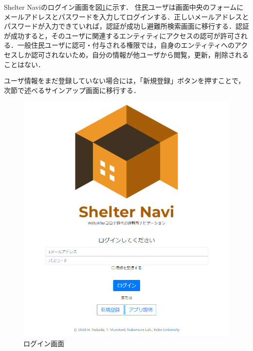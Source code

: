 \documentclass[technicalreport,dvipdfmx]{ieicej}
\begin{document}
Shelter Naviのログイン画面を図\ref{fig:login}に示す．
住民ユーザは画面中央のフォームにメールアドレスとパスワードを入力してログインする．正しいメールアドレスとパスワードが入力できていれば，認証が成功し避難所検索画面に移行する．認証が成功すると，そのユーザに関連するエンティティにアクセスの認可が許可される．一般住民ユーザに認可・付与される権限では，自身のエンティティへのアクセスしか認可されないため，自分の情報が他ユーザから閲覧，更新，削除されることはない．

ユーザ情報をまだ登録していない場合には，「新規登録」ボタンを押すことで，次節で述べるサインアップ画面に移行する．

\begin{figure}[t]
     \begin{center}
          \includegraphics[scale=0.5,pagebox=cropbox,clip]{img/login.png}
          \caption{ログイン画面}
          \label{fig:login}
     \end{center}
\end{figure}

\end{document}
